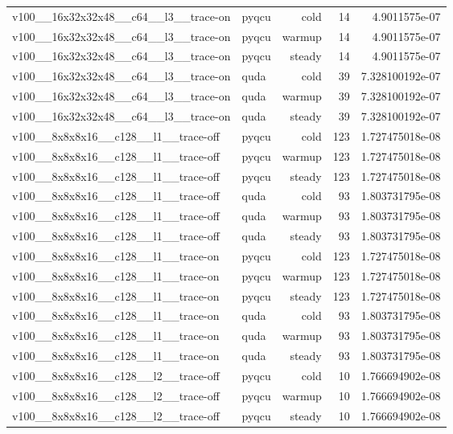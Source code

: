 \begin{table}[htbp]
\begin{tabular}{@{}llrrr@{}}
v100\_\_16x32x32x48\_\_c64\_\_l3\_\_trace-on & pyqcu & cold & 14 & 4.9011575e-07 \\
v100\_\_16x32x32x48\_\_c64\_\_l3\_\_trace-on & pyqcu & warmup & 14 & 4.9011575e-07 \\
v100\_\_16x32x32x48\_\_c64\_\_l3\_\_trace-on & pyqcu & steady & 14 & 4.9011575e-07 \\
v100\_\_16x32x32x48\_\_c64\_\_l3\_\_trace-on & quda & cold & 39 & 7.328100192e-07 \\
v100\_\_16x32x32x48\_\_c64\_\_l3\_\_trace-on & quda & warmup & 39 & 7.328100192e-07 \\
v100\_\_16x32x32x48\_\_c64\_\_l3\_\_trace-on & quda & steady & 39 & 7.328100192e-07 \\
v100\_\_8x8x8x16\_\_c128\_\_l1\_\_trace-off & pyqcu & cold & 123 & 1.727475018e-08 \\
v100\_\_8x8x8x16\_\_c128\_\_l1\_\_trace-off & pyqcu & warmup & 123 & 1.727475018e-08 \\
v100\_\_8x8x8x16\_\_c128\_\_l1\_\_trace-off & pyqcu & steady & 123 & 1.727475018e-08 \\
v100\_\_8x8x8x16\_\_c128\_\_l1\_\_trace-off & quda & cold & 93 & 1.803731795e-08 \\
v100\_\_8x8x8x16\_\_c128\_\_l1\_\_trace-off & quda & warmup & 93 & 1.803731795e-08 \\
v100\_\_8x8x8x16\_\_c128\_\_l1\_\_trace-off & quda & steady & 93 & 1.803731795e-08 \\
v100\_\_8x8x8x16\_\_c128\_\_l1\_\_trace-on & pyqcu & cold & 123 & 1.727475018e-08 \\
v100\_\_8x8x8x16\_\_c128\_\_l1\_\_trace-on & pyqcu & warmup & 123 & 1.727475018e-08 \\
v100\_\_8x8x8x16\_\_c128\_\_l1\_\_trace-on & pyqcu & steady & 123 & 1.727475018e-08 \\
v100\_\_8x8x8x16\_\_c128\_\_l1\_\_trace-on & quda & cold & 93 & 1.803731795e-08 \\
v100\_\_8x8x8x16\_\_c128\_\_l1\_\_trace-on & quda & warmup & 93 & 1.803731795e-08 \\
v100\_\_8x8x8x16\_\_c128\_\_l1\_\_trace-on & quda & steady & 93 & 1.803731795e-08 \\
v100\_\_8x8x8x16\_\_c128\_\_l2\_\_trace-off & pyqcu & cold & 10 & 1.766694902e-08 \\
v100\_\_8x8x8x16\_\_c128\_\_l2\_\_trace-off & pyqcu & warmup & 10 & 1.766694902e-08 \\
v100\_\_8x8x8x16\_\_c128\_\_l2\_\_trace-off & pyqcu & steady & 10 & 1.766694902e-08 \\

\end{tabular}
\end{table}
